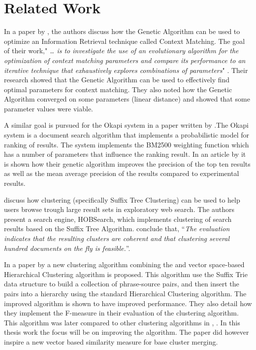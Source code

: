 \section{Related Work}
\label{RelatedWork}
In  a paper by \citeauthor{Zakos2005}, the authors discuss how the Genetic Algorithm can be used to optimize an Information Retrieval technique called Context Matching. The goal of their work," \textit{{\dots} is to investigate the use of an evolutionary algorithm for the optimization of context matching parameters and compare its performance to an iterative technique that exhaustively explores combinations of parameters}" \cite[582]{Zakos2005}. Their research showed that the Genetic Algorithm can be used to effectively find optimal parameters for context matching. They also noted how the Genetic Algorithm converged on some parameters (linear distance) and showed that some parameter values were viable.

A similar goal is pursued for the Okapi system in a paper written by \cite{Chuan2003}.The Okapi system is a document search algorithm that implements a probabilistic model for ranking of results. The system implements the BM2500 weighting function which has a number of parameters that influence the ranking result. In an article by \cite{Chuan2003} it is shown how their genetic algorithm improves the precision of the top ten results as well as the mean average precision of the results compared to experimental results.

\cite{gulla2008contextualized} discuss how clustering (specifically Suffix Tree Clustering) can be used to help users browse trough large result sets in exploratory web search. The authors present a search engine, HOBSearch, which implements clustering of search results based on the Suffix Tree Algorithm. \citeauthor[21]{gulla2008contextualized} conclude that, ``\textit{The evaluation indicates that the resulting clusters are coherent and that clustering several hundred documents on the fly is feasible.}''.

In a paper by \cite{Chim2007} a new clustering algorithm combining the \STC and vector space-based Hierarchical Clustering algorithm is proposed. This algorithm use the Suffix Trie data structure to build a collection of phrase-source pairs, and then insert the pairs into a hierarchy using the standard Hierarchical Clustering algorithm. The improved algorithm is shown to have improved performance. They also detail how they implement the F-measure in their evaluation of the clustering algorithm. This algorithm was later compared to other clustering algorithms in , \cite{Chim2008}. In this thesis work the focus will be on improving the \CTC algorithm. The paper did however inspire a new vector based similarity measure for base cluster merging.